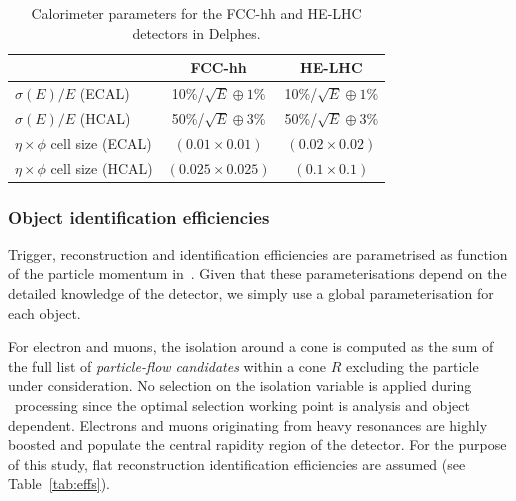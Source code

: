 \begin {table}[htb!]
\begin{center}
\begin{tabular}{l||c|c}
& FCC-hh & HE-LHC  \\
  \hline
  \hline
$\sigma(E)/E $ (ECAL)& 10\%/$\sqrt{E} \oplus 1\%$ &  10\%/$\sqrt{E} \oplus 1\%$\\
   \hline
$\sigma(E)/E $ (HCAL)& 50\%/$\sqrt{E} \oplus 3\%$  &  50\%/$\sqrt{E} \oplus 3\%$\\
  \hline
  \hline
$\eta \times \phi$ cell size (ECAL)& $(0.01\times0.01)$ &  $(0.02\times0.02)$\\
  \hline
 $\eta \times \phi$ cell size  (HCAL)& $(0.025\times0.025)$ & $(0.1\times0.1)$
\end{tabular}
\caption{Calorimeter parameters for the FCC-hh and HE-LHC detectors in Delphes.}
\label{tab:cal_param}
\end{center}
\end{table}

\subsubsection{Object identification efficiencies}
\label{appsub:objid}

Trigger, reconstruction and identification efficiencies are parametrised as function of the particle momentum in~\delphes{}. Given that these parameterisations depend on the detailed knowledge of the detector, we simply use a global parameterisation for each object.

For electron and muons, the isolation around a cone is computed as the sum of the full list of \emph{particle-flow candidates} within a cone $R$ excluding the particle under consideration. No selection on the isolation variable is applied during \delphes\ processing since the optimal selection working point is analysis and object dependent. Electrons and muons originating from heavy resonances are highly boosted and populate the central rapidity region of the detector. For the purpose of this study, flat reconstruction identification efficiencies are assumed (see Table~\ref{tab:effs}).

